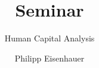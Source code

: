 

\title{Seminar}
\subtitle{Human Capital Analysis}
\author{Philipp Eisenhauer}

\date{}

\let\otp\titlepage
